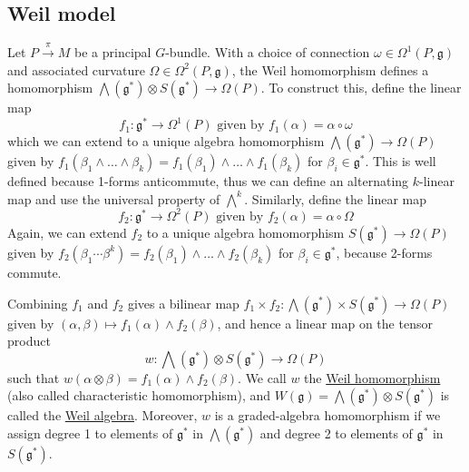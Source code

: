 \subsection{Weil model}
Let $P\xrightarrow{\pi} M$ be a principal  $G$-bundle. With a choice of
connection  $\omega\in\Omega^1(P,\mathfrak{g})$ and associated curvature
$\Omega\in\Omega^2(P,\mathfrak{g})$,
the Weil homomorphism defines a homomorphism $\bigwedge(\mathfrak{g}^*)\otimes
S(\mathfrak{g}^*) \to \Omega(P)$. To construct this, define the linear map 
\[
	f_1 : \mathfrak{g}^* \to \Omega^1(P) \text{ given by }
	f_1(\alpha) = \alpha \circ \omega
\] 
which we can extend to a unique algebra homomorphism 
$\bigwedge(\mathfrak{g}^*)\to\Omega(P)$ given by $f_1(\beta_1\wedge\ldots\wedge \beta_k)
= f_1(\beta_1)\wedge\ldots\wedge f_1(\beta_k)$ for $\beta_i\in\mathfrak{g}^*$.
This is well defined because 1-forms anticommute, thus we can define an
alternating $k$-linear map and use the universal property of  $\bigwedge^k$.
Similarly, define the linear map 
\[
	f_2 : \mathfrak{g}^* \to \Omega^2(P) \text{ given by }
	f_2(\alpha) = \alpha \circ \Omega
\]
Again, we can extend $f_2$ to a unique algebra homomorphism 
$S(\mathfrak{g}^*)\to \Omega(P)$ given by
$f_2(\beta_1\cdots\beta^k)=f_2(\beta_1)\wedge\ldots\wedge f_2(\beta_k)$ for
$\beta_i\in\mathfrak{g}^*$, because 2-forms commute.

Combining $f_1$ and $f_2$ gives a bilinear map $f_1\times f_2 :
\bigwedge(\mathfrak{g}^*)\times S(\mathfrak{g}^*) \to \Omega(P)$ given by
$(\alpha,\beta)\mapsto f_1(\alpha)\wedge f_2(\beta)$, and hence a linear 
map on the tensor product
\[
w : \bigwedge(\mathfrak{g}^*)\otimes S(\mathfrak{g}^*) \to \Omega(P)
\] 
such that $w(\alpha\otimes \beta) = f_1(\alpha)\wedge f_2(\beta)$.
We call $w$ the \underline{Weil homomorphism} (also called characteristic
homomorphism), and 
$W(\mathfrak{g}) =\bigwedge(\mathfrak{g}^*)\otimes S(\mathfrak{g}^*)$
is called the \underline{Weil algebra}.
Moreover, $w$ is a graded-algebra homomorphism if we assign degree 1 to elements of
$\mathfrak{g}^*$ in $\bigwedge(\mathfrak{g}^*)$ and degree 2 to 
elements of $\mathfrak{g}^*$ in $S(\mathfrak{g}^*)$.

